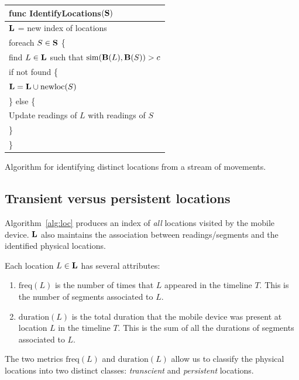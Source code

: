 \begin{algorithm}[h]
    \centering
\begin{tabular}{|l|} \hline
    func IdentifyLocations$(\mathbf{S})$ \\ \hline
    $\mathbf{L}$ = new index of locations \\
    foreach $S\in\mathbf{S}$ \{ \\
        \RRR find $L\in\mathbf{L}$ such that $\mathrm{sim}(\mathbf{B}(L), \mathbf{B}(S)) > c$ \\
        \RRR if not found \{ \\
        \RRR \RRR $\mathbf{L} = \mathbf{L}\cup \mathrm{newloc}(S)$ \\
        \RRR \} else \{ \\
        \RRR \RRR Update readings of $L$ with readings of $S$ \\
        \RRR \} \\
    \}\\ \hline
\end{tabular}
\vspace{0.4cm}
\caption{Algorithm for identifying distinct locations from a stream of
movements.}
\label{alg:loc}
\end{algorithm}

\subsection{Transient versus persistent locations}

Algorithm~\ref{alg:loc} produces an index of {\em all} locations visited by the
mobile device.  $\mathbf{L}$ also maintains the association between readings/segments
and the identified physical locations.

Each location $L\in\mathbf{L}$ has several attributes:
\begin{enumerate}
    \item $\mathrm{freq}(L)$ is the number of times that $L$ appeared in the
        timeline $T$.  This is the number of segments associated to $L$.
    \item $\mathrm{duration}(L)$ is the total duration that the mobile device
        was present at location $L$ in the timeline $T$.  This is the sum of all
        the durations of segments associated to $L$.
\end{enumerate}

The two metrics $\mathrm{freq}(L)$ and $\mathrm{duration}(L)$ allow us to
classify the physical locations into two distinct classes: {\em transcient} and
{\em persistent} locations.

